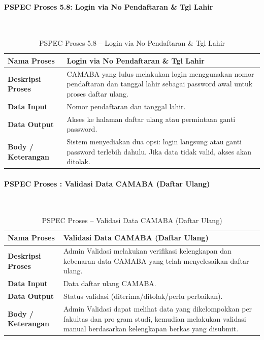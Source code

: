 \paragraph{PSPEC Proses 5.8: Login via No Pendaftaran \& Tgl Lahir}~\\
\begin{longtable}{|p{}|p{}|}
	\caption{PSPEC Proses 5.8 -- Login via No Pendaftaran \& Tgl Lahir}
	\label{table:3.pspec58}\\
	\hline
	\textbf{Nama Proses} & Login via No Pendaftaran \& Tgl Lahir \\
	\hline
	\textbf{Deskripsi Proses} & CAMABA yang lulus melakukan login menggunakan nomor pendaftaran dan tanggal lahir sebagai password awal untuk proses daftar ulang. \\
	\hline
	\textbf{Data Input} & Nomor pendaftaran dan tanggal lahir. \\
	\hline
	\textbf{Data Output} & Akses ke halaman daftar ulang atau permintaan ganti password. \\
	\hline
	\textbf{Body / Keterangan} & Sistem menyediakan dua opsi: login langsung atau ganti password terlebih dahulu. Jika data tidak valid, akses akan ditolak. \\
	\hline
\end{longtable}


\paragraph{PSPEC Proses : Validasi Data CAMABA (Daftar Ulang)}~\\
\begin{longtable}{|p{}|p{}|}
	\caption{PSPEC Proses  -- Validasi Data CAMABA (Daftar Ulang)}
	\label{table:3.pspec}\\
	\hline
	\textbf{Nama Proses} & Validasi Data CAMABA (Daftar Ulang) \\
	\hline
	\textbf{Deskripsi Proses} & Admin Validasi melakukan verifikasi kelengkapan dan kebenaran data CAMABA yang telah menyelesaikan daftar ulang. \\
	\hline
	\textbf{Data Input} & Data daftar ulang CAMABA. \\
	\hline
	\textbf{Data Output} & Status validasi (diterima/ditolak/perlu perbaikan). \\
	\hline
	\textbf{Body / Keterangan} & Admin Validasi dapat melihat data yang dikelompokkan per fakultas dan pro gram studi, kemudian melakukan validasi manual berdasarkan kelengkapan berkas yang disubmit. \\
	\hline
\end{longtable}


